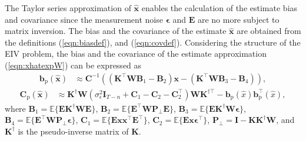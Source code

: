 The Taylor series approximation of $\widehat{\mathbf{x}}$ enables the calculation of the estimate bias and covariance since the measurement noise $\bm{\epsilon}$ and $\mathbf{E}$ are no more subject to matrix inversion. 
The bias and the covariance of the estimate $\widehat{\mathbf{x}}$ are obtained from the definitions (\ref{eqn:biasdef}), and (\ref{eqn:covdef}). %
Considering the structure of the EIV problem, the bias and the covariance of the estimate approximation (\ref{eqn:xhatexpW}) can be expressed as
\begin{equation} \begin{aligned} \mathbf{b}_{\mathrm{p}} \left( \widehat{\mathbf{x}} \right) & \approx \mathbf{C}^{-1} \left(  \left( \mathbf{K}^\top \mathbf{W} \mathbf{B}_1 - \mathbf{B}_2 \right) \mathbf{x} - \left( \mathbf{K}^\top \mathbf{W} \mathbf{B}_3 - \mathbf{B}_4 \right) \right), \end{aligned} \label{eqn:biasEW} \end{equation}
\begin{equation} \begin{aligned} \mathbf{C}_{\mathrm{p}} \left( \widehat{\mathbf{x}} \right) & \approx \mathbf{K}^\dagger \mathbf{W} \left( \sigma_{\epsilon}^2 \mathbf{I}_{T-n} + \mathbf{C}_1 - \mathbf{C}_2 - \mathbf{C}_2^\top \right) \mathbf{W} \mathbf{K}^{\dagger \top} - \mathbf{b}_{\mathrm{p}} \left( \widehat{x} \right) \mathbf{b}_{\mathrm{p}}^\top \left( \widehat{x} \right), \end{aligned} \label{eqn:varEW} \end{equation}
where $\mathbf{B}_1 = \mathbb{E} \Big\{ \mathbf{E} \mathbf{K}^\dagger \mathbf{W} \mathbf{E} \Big\}$, $\mathbf{B}_2 = \mathbb{E} \Big\{ \mathbf{E}^\top \mathbf{W} \mathbf{P}_\perp \mathbf{E} \Big\}$, $\mathbf{B}_3 = \mathbb{E} \Big\{ \mathbf{E} \mathbf{K}^\dagger \mathbf{W} \bm{\epsilon} \Big\}$, $\mathbf{B}_4 = \mathbb{E} \Big\{ \mathbf{E}^\top \mathbf{W} \mathbf{P}_\perp \bm{\epsilon} \Big\}$, $\mathbf{C}_1 = \mathbb{E} \Big\{ \mathbf{E} \mathbf{x} \mathbf{x}^\top \mathbf{E}^\top \Big\}$, $\mathbf{C}_2 = \mathbb{E} \Big\{ \mathbf{E} \mathbf{x} \bm{\epsilon}^\top \Big\}$, $\mathbf{P}_\perp = \mathbf{I} - \mathbf{K} \mathbf{K}^\dagger \mathbf{W}$, and $\mathbf{K}^\dagger$ is the pseudo-inverse matrix of $\mathbf{K}$. 

